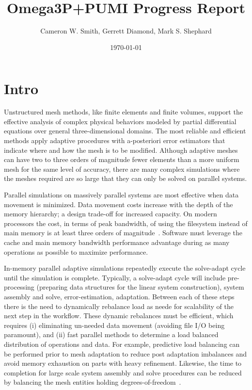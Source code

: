 \documentclass[a4paper]{article}
\title{Omega3P+PUMI Progress Report}
\author{Cameron W. Smith, Gerrett Diamond, Mark S. Shephard}
\date{\today}
\begin{document}
\maketitle
\section{Intro}

Unstructured mesh methods, like finite elements and finite volumes, support the
effective analysis of complex physical behaviors modeled by partial differential
equations over general three-dimensional domains.
The most reliable and efficient methods apply adaptive procedures with
a-posteriori error estimators that indicate where and how the mesh is to be
modified.
Although adaptive meshes can have two to three orders of magnitude fewer
elements than a more uniform mesh for the same level of accuracy, there are many
complex simulations where the meshes required are so large that they can only be
solved on parallel systems.

Parallel simulations on massively parallel systems are most effective when data
movement is minimized.
Data movement costs increase with the depth of the memory hierarchy; a design
trade-off for increased capacity.
On modern processors the cost, in terms of peak bandwidth, of using the
filesystem instead of main memory is at least three orders of
magnitude~\cite{haring2012ibm,bui2014scalable}.
Software must leverage the cache and main memory bandwidth performance advantage
during as many operations as possible to maximize performance.

In-memory parallel adaptive simulations repeatedly execute the solve-adapt cycle
until the simulation is complete.
Typically, a solve-adapt cycle will include pre-processing (preparing data
structures for the linear system construction), system assembly and solve,
error-estimation, adaptation.
Between each of these steps there is the need to dynamically rebalance load as
neede for scalability of the next step in the workflow.
These dynamic rebalances must be efficient, which requires (i) eliminating
un-needed data movement (avoiding file I/O being paramount), and (ii) fast
parallel methods to determine a load balanced distribution of operations and
data.
For example, predictive load balancing can be performed prior to mesh adaptation
to reduce post adaptation imbalances and avoid memory exhaustion on parts with
heavy refinement.
Likewise, the time to completion for large scale system assembly and solve
procedures can be reduced by balancing the mesh entities holding
degrees-of-freedom~\cite{SmithParma2015,zhou2012unstructured}.
\end{document}

